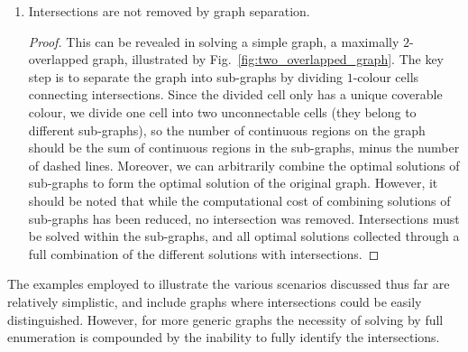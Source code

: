 \documentclass[journal]{IEEEtran}
\begin{document}
\begin{enumerate}
\begin{proof}
However, note that whilst the optimal number can be directly deduced, to get all optimal cellular decompositions the intersection still needs to be enumeratively solved. 
For the $i$-th entry, two scenarios must then be separately regarded, as illustrated in Fig.~\ref{fig:multi_entry}: %
(a) keeping itself disconnected so that entries $(i-1)$ and $(i+1)$ can be connected (Fig.~\ref{fig:multi_entry}, top-right), %
or (b) connecting it to other entries (Fig.~\ref{fig:multi_entry}, bottom-right). %
Both of them go to optimal cellular decompositions.
It is intuitive that more complex intersections can be devolved into simpler cases through connecting entries, thus transforming higher-entry cases into simpler cases as the example above, ultimately requiring solving through enumerative cellular decomposition regardless.
\end{proof}
\item Intersections are not removed by graph separation. 
\begin{proof}
This can be revealed in solving a simple graph, a maximally $2$-overlapped graph, 
illustrated by Fig.~\ref{fig:two_overlapped_graph}.  
The key step is to separate the graph into sub-graphs by dividing $1$-colour cells connecting intersections. 
Since the divided cell only has a unique coverable colour, we divide one cell into two unconnectable cells (they belong to different sub-graphs), so the number of continuous regions on the graph should be the sum of continuous regions in the sub-graphs, minus the number of dashed lines. 
Moreover, we can arbitrarily combine the optimal solutions of sub-graphs to form the optimal solution of the original graph. 
However, it should be noted that while the computational cost of combining solutions of sub-graphs has been reduced, no intersection was removed. 
Intersections must be solved within the sub-graphs, and all optimal solutions collected through a full combination of the different solutions with 
intersections. 
\end{proof}
\end{enumerate}


The examples employed to illustrate the various scenarios discussed thus far are relatively simplistic, and include graphs where intersections 
could be easily distinguished. However, for more generic graphs the necessity of solving by full enumeration is compounded by the 
inability to fully identify the intersections. 
\end{document}
